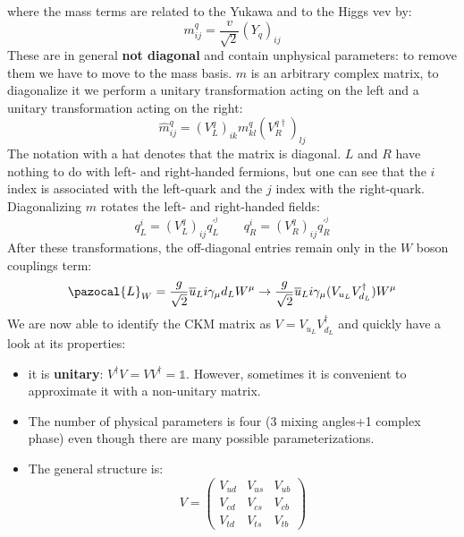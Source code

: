 \documentclass[../main.tex]{subfiles}
\begin{document}
where the mass terms are related to the Yukawa and to the Higgs vev by:
\[
m_{ij}^q=\frac{v}{\sqrt{2}}(Y_q)_{ij}
\]
These are in general \textbf{not diagonal} and contain unphysical parameters: to remove them we have to move to the mass basis. $m$ is an arbitrary complex matrix, to diagonalize it we perform a unitary transformation acting on the left and a unitary transformation acting on the right:
\[
\hat{m}_{ij}^q=(V_L^q)_{ik}m_{kl}^q(V_R^{q\dagger})_{lj}
\]
The notation with a hat denotes that the matrix is diagonal. $L$ and $R$ have nothing to do with left- and right-handed fermions, but one can see that the $i$ index is associated with the left-quark and the $j$ index with the right-quark. Diagonalizing $m$ rotates the left- and right-handed fields:
\[
q_L^i=(V_L^q)_{ij}q_L^{'^j} \qquad q_R^i=(V_R^q)_{ij}q_R^{'^j}
\]
After these transformations, the off-diagonal entries remain only in the $W$ boson couplings term:
\[
\pazocal{L}_W=\frac{g}{\sqrt{2}}\overline{u}_Li\gamma_\mu d_LW^\mu\to\frac{g}{\sqrt{2}}\overline{u}_Li\gamma_\mu(V_{u_L}V_{d_L}^\dagger)W^\mu
\]
We are now able to identify the CKM matrix as $V=V_{u_L}V_{d_L}^\dagger$ and quickly have a look at its properties:
\begin{itemize}
    \item it is \textbf{unitary}: $V^\dagger V=VV^\dagger=\mathbb{1}$. However, sometimes it is convenient to approximate it with a non-unitary matrix.
    \item The number of physical parameters is four (3 mixing angles+1 complex phase) even though there are many possible parameterizations.
    \item The general structure is:
    \[
    V=\left(\begin{array}{ccc}
    V_{ud} & V_{us} & V_{ub} \\
    V_{cd} & V_{cs} & V_{cb} \\
    V_{td} & V_{ts} & V_{tb}
\end{array}\right)
    \]
\end{itemize}
\end{document}
